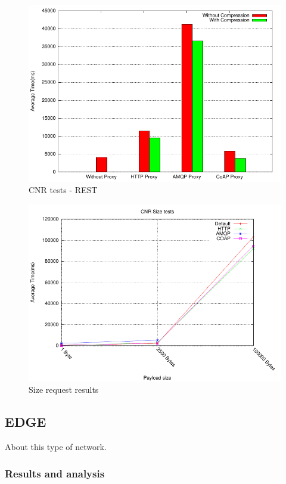 \begin{figure}[H]
\center
\includegraphics[scale=0.75]{../results/cnr/rest/result.pdf}
\caption{CNR tests - REST}
\end{figure}

\begin{figure}[H]
\center
\includegraphics[scale=0.75]{../results/cnr/size/result.pdf}
\caption{Size request results}
\end{figure}


\subsection{EDGE}

About this type of network.

\subsubsection{Results and analysis}

